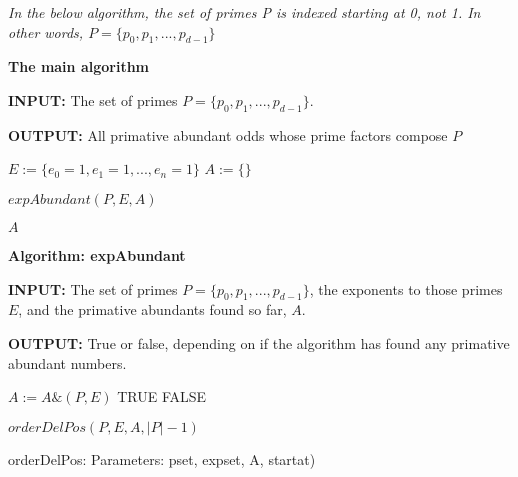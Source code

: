 \documentclass[../paper.tex]{subfiles}
\begin{document}

\textit{In the below algorithm, the set of primes P is indexed 
starting at 0, not 1. In other words, $P = \{p_0, p_1, ..., p_{d-1}\}$}

\begin{algorithmic}


{\setlength{\parindent{0cm}}

\textbf{The main algorithm}

\textbf{INPUT:} The set of primes 
$P = \{p_0, p_1, ..., p_{d-1}\}$.

\textbf{OUTPUT:} All primative abundant odds whose prime factors
compose $P$

}


\STATE $E := \{e_0 = 1,e_1 = 1,...,e_n = 1\}$
\STATE $A := \{ \}$ %

\STATE $expAbundant(P, E, A)$

\RETURN $A$

\end{algorithmic}

{\setlength{\parindent{0cm}}

\textbf{Algorithm: expAbundant}

\textbf{INPUT:} The set of primes 
$P = \{p_0, p_1, ..., p_{d-1}\}$, the exponents to those 
primes $E$, and the primative abundants found so far, $A$.

\textbf{OUTPUT:} True or false, depending on if the algorithm has found any
primative abundant numbers.

}

\begin{algorithmic}
		\STATE $A := A \& (P,E)$
		\RETURN TRUE
	\ENDIF
	\RETURN FALSE
\ENDIF

\RETURN $orderDelPos(P,E,A,|P| - 1)$

\end{algorithmic}

orderDelPos:
Parameters: pset, expset, A, startat)
\end{document}
